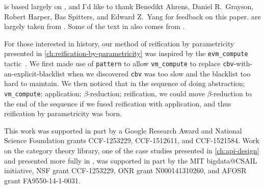  is based largely on , and I'd like to thank Benedikt Ahrens, Daniel R.~Grayson, Robert Harper, Bas Spitters, and Edward Z.~Yang for feedback on this paper.
 are largely taken from .
Some of the text in  also comes from .


For those interested in history, our method of reification by parametricity presented in \autoref{ch:reification-by-parametricity} was inspired by the \texttt{evm\_compute} tactic~\cite{MirrorShardITP14}.
We first made use of \texttt{pattern} to allow \texttt{vm\_compute} to replace \texttt{cbv}-with-an-explicit-blacklist when we discovered \texttt{cbv} was too slow and the blacklist too hard to maintain.
We then noticed that in the sequence of doing abstraction; \texttt{vm\_compute}; application; $\beta$-reduction; reification, we could move $\beta$-reduction to the end of the sequence if we fused reification with application, and thus reification by parametricity was born.

This work was supported in part by a Google Research Award and National Science Foundation grants CCF-1253229, CCF-1512611, and CCF-1521584.
Work on the category theory library, one of the case studies presented in \autoref{ch:api-design} and presented more fully in , was supported in part by the MIT bigdata@CSAIL initiative, NSF grant CCF-1253229, ONR grant N000141310260, and AFOSR grant FA9550-14-1-0031.

